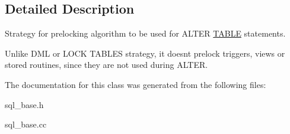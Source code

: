 \subsection{Detailed Description}
Strategy for prelocking algorithm to be used for A\+L\+T\+ER \mbox{\hyperlink{structTABLE}{T\+A\+B\+LE}} statements.

Unlike D\+ML or L\+O\+CK T\+A\+B\+L\+ES strategy, it doesn\textquotesingle{}t prelock triggers, views or stored routines, since they are not used during A\+L\+T\+ER. 

The documentation for this class was generated from the following files\+:\begin{DoxyCompactItemize}
\item 
sql\+\_\+base.\+h\item 
sql\+\_\+base.\+cc\end{DoxyCompactItemize}
